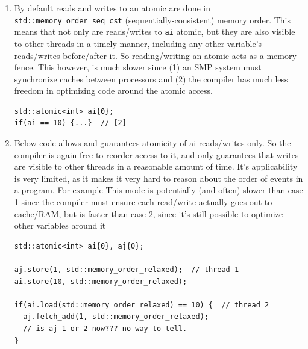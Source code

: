 \documentclass[a4paper,11pt,twoside]{book}
\begin{document}
\begin{itemize}
\begin{enumerate}
    \item By default reads and writes to an atomic are done in \texttt{std::memory\_order\_seq\_cst} (sequentially-consistent) memory order. This means that not only are reads/writes to \texttt{ai} atomic, but they are also visible to other threads in a timely manner, including any other variable's reads/writes before/after it. So reading/writing an atomic acts as a memory fence. This however, is much slower since (1) an SMP system must synchronize caches between processors and (2) the compiler has much less freedom in optimizing code around the atomic access.

\begin{lstlisting}[]
std::atomic<int> ai{0}; 
if(ai == 10) {...}  // [2]    
\end{lstlisting}

    \item Below code allows and guarantees atomicity of ai reads/writes only. So the compiler is again free to reorder access to it, and only guarantees that writes are visible to other threads in a reasonable amount of time. It's applicability is very limited, as it makes it very hard to reason about the order of events in a program. For example This mode is potentially (and often) slower than case 1 since the compiler must ensure each read/write actually goes out to cache/RAM, but is faster than case 2, since it's still possible to optimize other variables around it
\begin{lstlisting}[]
std::atomic<int> ai{0}, aj{0}; 
 
aj.store(1, std::memory_order_relaxed);  // thread 1 
ai.store(10, std::memory_order_relaxed); 
 
if(ai.load(std::memory_order_relaxed) == 10) {  // thread 2 
  aj.fetch_add(1, std::memory_order_relaxed); 
  // is aj 1 or 2 now??? no way to tell. 
} 
\end{lstlisting}
	\end{enumerate}
\end{itemize}
\end{document}
